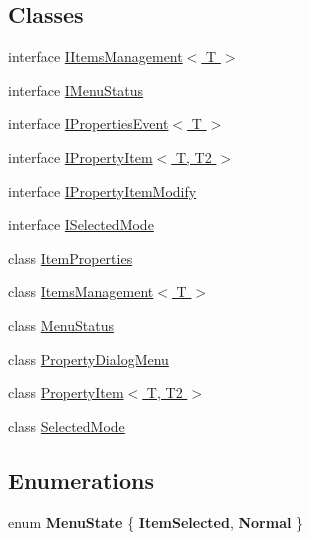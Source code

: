 \subsection*{Classes}
\begin{DoxyCompactItemize}
\item 
interface \hyperlink{interfacelib_watcher_dialog_1_1_property_item_1_1_i_items_management_3_01_t_01_4}{I\+Items\+Management$<$ T $>$}
\item 
interface \hyperlink{interfacelib_watcher_dialog_1_1_property_item_1_1_i_menu_status}{I\+Menu\+Status}
\item 
interface \hyperlink{interfacelib_watcher_dialog_1_1_property_item_1_1_i_properties_event_3_01_t_01_4}{I\+Properties\+Event$<$ T $>$}
\item 
interface \hyperlink{interfacelib_watcher_dialog_1_1_property_item_1_1_i_property_item_3_01_t_00_01_t2_01_4}{I\+Property\+Item$<$ T, T2 $>$}
\item 
interface \hyperlink{interfacelib_watcher_dialog_1_1_property_item_1_1_i_property_item_modify}{I\+Property\+Item\+Modify}
\item 
interface \hyperlink{interfacelib_watcher_dialog_1_1_property_item_1_1_i_selected_mode}{I\+Selected\+Mode}
\item 
class \hyperlink{classlib_watcher_dialog_1_1_property_item_1_1_item_properties}{Item\+Properties}
\item 
class \hyperlink{classlib_watcher_dialog_1_1_property_item_1_1_items_management_3_01_t_01_4}{Items\+Management$<$ T $>$}
\item 
class \hyperlink{classlib_watcher_dialog_1_1_property_item_1_1_menu_status}{Menu\+Status}
\item 
class \hyperlink{classlib_watcher_dialog_1_1_property_item_1_1_property_dialog_menu}{Property\+Dialog\+Menu}
\item 
class \hyperlink{classlib_watcher_dialog_1_1_property_item_1_1_property_item_3_01_t_00_01_t2_01_4}{Property\+Item$<$ T, T2 $>$}
\item 
class \hyperlink{classlib_watcher_dialog_1_1_property_item_1_1_selected_mode}{Selected\+Mode}
\end{DoxyCompactItemize}
\subsection*{Enumerations}
\begin{DoxyCompactItemize}
\item 
\hypertarget{namespacelib_watcher_dialog_1_1_property_item_a913268aedd21e47f3018215a1eed2d3a}{enum {\bfseries Menu\+State} \{ {\bfseries Item\+Selected}, 
{\bfseries Normal}
 \}}\label{namespacelib_watcher_dialog_1_1_property_item_a913268aedd21e47f3018215a1eed2d3a}

\end{DoxyCompactItemize}
